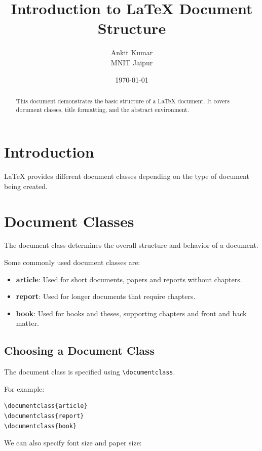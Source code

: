 \documentclass[12pt,a4paper]{article}
\title{\Huge\bfseries Introduction to LaTeX Document Structure}
\author{
    Ankit Kumar \\
    \small MNIT Jaipur
}
\date{\today}
\begin{document}
\maketitle

\begin{abstract}
This document demonstrates the basic structure of a
LaTeX document. It covers document classes, title
formatting, and the abstract environment.
\end{abstract}

\section{Introduction}

LaTeX provides different document classes depending
on the type of document being created.

\section{Document Classes}

The document class determines the overall structure
and behavior of a document.

Some commonly used document classes are:

\begin{itemize}
    \item \textbf{article}: Used for short documents,
    papers and reports without chapters.

    \item \textbf{report}: Used for longer documents
    that require chapters.

    \item \textbf{book}: Used for books and theses,
    supporting chapters and front and back matter.
\end{itemize}

\subsection{Choosing a Document Class}

The document class is specified using
\texttt{\textbackslash documentclass}.

For example:

\begin{verbatim}
\documentclass{article}
\documentclass{report}
\documentclass{book}
\end{verbatim}

We can also specify font size and paper size:
\end{document}
